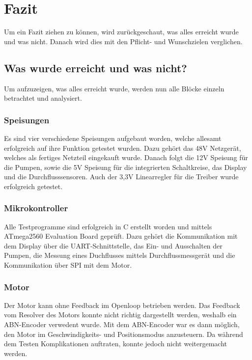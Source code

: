 \clearpage
\section{Fazit}
\label{sec:Fazit}

Um ein Fazit ziehen zu können, wird zurückgeschaut, was alles erreicht wurde und was nicht. Danach wird dies mit den Pflicht- und Wunschzielen verglichen.

\subsection{Was wurde erreicht und was nicht?}
\label{subsec:Was_wurde_erreicht_und_was_nicht}

Um aufzuzeigen, was alles erreicht wurde, werden nun alle Blöcke einzeln betrachtet und analysiert.

\subsubsection{Speisungen}
\label{subsubsec:Fazit_Speisungen}

Es sind vier verschiedene Speisungen aufgebaut worden, welche allesamt erfolgreich auf ihre Funktion getestet wurden. Dazu gehört das 48V Netzgerät, welches als fertiges Netzteil eingekauft wurde. Danach folgt die 12V Speisung für die Pumpen, sowie die 5V Speisung für die integrierten Schaltkreise, das Display und die Durchflusssensoren. Auch der 3,3V Linearregler für die Treiber wurde erfolgreich getestet. 

\subsubsection{Mikrokontroller}
\label{subsubsec:Fazit_Mikrokontroller}

Alle Testprogramme sind erfolgreich in C erstellt worden und mittels ATmega2560 Evaluation Board geprüft. Dazu gehört die Kommunikation mit dem Display über die UART-Schnittstelle, das Ein- und Ausschalten der Pumpen, die Messung eines Duchflusses mittels Durchflussmessgerät und die Kommunikation über SPI mit dem Motor.

\subsubsection{Motor}
\label{subsubsec:Fazit_Motor}

Der Motor kann ohne Feedback im Openloop betrieben werden. Das Feedback vom Resolver des Motors konnte nicht richtig dargestellt werden, weshalb ein ABN-Encoder verwedent wurde. Mit dem ABN-Encoder war es dann möglich, den Motor im Geschwindigkeits- und Positionsmodus anzusteuern. Da während dem Testen Komplikationen auftraten, konnte jedoch nicht weitergemacht werden.

